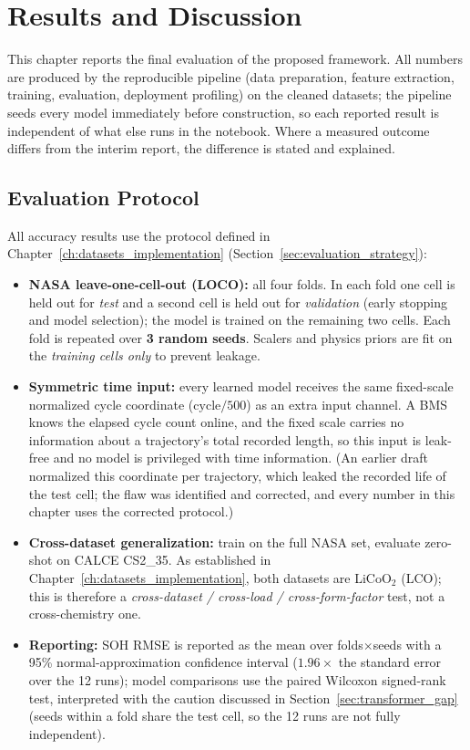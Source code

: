\chapter{Results and Discussion}
\label{ch:results}

This chapter reports the final evaluation of the proposed framework. All numbers
are produced by the reproducible pipeline (data preparation, feature extraction,
training, evaluation, deployment profiling) on the cleaned datasets; the pipeline
seeds every model immediately before construction, so each reported result is
independent of what else runs in the notebook. Where a measured outcome differs
from the interim report, the difference is stated and explained.

\section{Evaluation Protocol}
\label{sec:eval_protocol}

All accuracy results use the protocol defined in
Chapter~\ref{ch:datasets_implementation} (Section~\ref{sec:evaluation_strategy}):

\begin{itemize}
    \item \textbf{NASA leave-one-cell-out (LOCO):} all four folds. In each fold
    one cell is held out for \emph{test} and a second cell is held out for
    \emph{validation} (early stopping and model selection); the model is trained
    on the remaining two cells. Each fold is repeated over \textbf{3 random
    seeds}. Scalers and physics priors are fit on the \emph{training cells only}
    to prevent leakage.
    \item \textbf{Symmetric time input:} every learned model receives the same
    fixed-scale normalized cycle coordinate ($\mathrm{cycle}/500$) as an extra
    input channel. A BMS knows the elapsed cycle count online, and the fixed
    scale carries no information about a trajectory's total recorded length, so
    this input is leak-free and no model is privileged with time information.
    (An earlier draft normalized this coordinate per trajectory, which leaked
    the recorded life of the test cell; the flaw was identified and corrected,
    and every number in this chapter uses the corrected protocol.)
    \item \textbf{Cross-dataset generalization:} train on the full NASA set,
    evaluate zero-shot on CALCE CS2\_35. As established in
    Chapter~\ref{ch:datasets_implementation}, both datasets are LiCoO$_2$
    (LCO); this is therefore a \emph{cross-dataset / cross-load /
    cross-form-factor} test, not a cross-chemistry one.
    \item \textbf{Reporting:} SOH RMSE is reported as the mean over folds$\times$seeds
    with a 95\% normal-approximation confidence interval ($1.96\times$ the
    standard error over the 12 runs); model comparisons use the paired Wilcoxon
    signed-rank test, interpreted with the caution discussed in
    Section~\ref{sec:transformer_gap} (seeds within a fold share the test cell,
    so the 12 runs are not fully independent).
\end{itemize}


